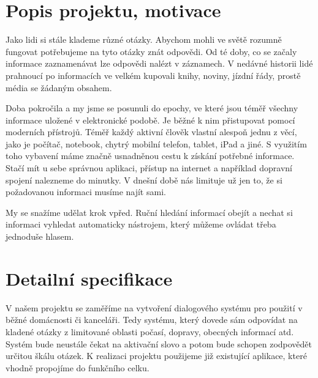 \documentclass[12pt,a4paper]{article}
\begin{document}
\newpage
\pagestyle{plain}     %
\setcounter{page}{1}
\addtolength{\voffset}{-3cm}
\addtolength{\headheight}{2cm}

\pagestyle{fancy}
\lfoot{}
\cfoot{\thepage}
\rfoot{}
\renewcommand{\headrulewidth}{0.4pt}


\section*{Popis projektu, motivace}
Jako lidi si stále klademe různé otázky. Abychom mohli ve světě rozumně fungovat potřebujeme na tyto otázky znát odpovědi. Od té doby, co se začaly informace zaznamenávat lze odpovědi nalézt v záznamech. V nedávné historii lidé prahnoucí po informacích ve velkém kupovali knihy, noviny, jízdní řády, prostě média se žádaným obsahem. 

Doba pokročila a my jsme se posunuli do epochy, ve které jsou téměř všechny informace uložené v elektronické podobě. Je běžné k nim přistupovat pomocí moderních přístrojů. Téměř každý aktivní člověk vlastní alespoň jednu z věcí, jako je počítač, notebook, chytrý mobilní telefon, tablet, iPad a jiné. S využitím toho vybavení máme značně usnadněnou cestu k získání potřebné informace. Stačí mít u sebe správnou aplikaci, přístup na internet a například dopravní spojení nalezneme do minutky. V dnešní době nás limituje už jen to, že si požadovanou informaci musíme najít sami.

My se snažíme udělat krok vpřed. Ruční hledání informací obejít a nechat si informaci vyhledat automaticky nástrojem, který můžeme ovládat třeba jednoduše hlasem.

\section*{Detailní specifikace}
V našem projektu se zaměříme na vytvoření dialogového systému pro použití v běžné domácnosti či kanceláři. Tedy systému, který dovede sám odpovídat na kladené otázky z limitované oblasti počasí, dopravy, obecných informací atd. Systém bude neustále čekat na aktivační slovo a potom bude schopen zodpovědět určitou škálu otázek. K realizaci projektu použijeme již existující aplikace, které vhodně propojíme do funkčního celku.
\end{document}
